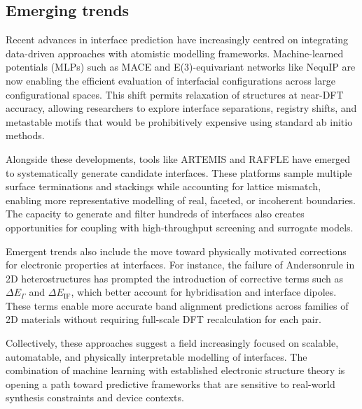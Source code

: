 \subsection{Emerging trends} 
 
Recent advances in interface prediction have increasingly centred on integrating data-driven approaches with atomistic modelling frameworks. Machine-learned potentials (MLPs) such as MACE and E(3)-equivariant networks like NequIP are now enabling the efficient evaluation of interfacial configurations across large configurational spaces. This shift permits relaxation of structures at near-DFT accuracy, allowing researchers to explore interface separations, registry shifts, and metastable motifs that would be prohibitively expensive using standard ab initio methods. 
 
Alongside these developments, tools like ARTEMIS and RAFFLE have emerged to systematically generate candidate interfaces. These platforms sample multiple surface terminations and stackings while accounting for lattice mismatch, enabling more representative modelling of real, faceted, or incoherent boundaries. The capacity to generate and filter hundreds of interfaces also creates opportunities for coupling with high-throughput screening and surrogate models. 
 
Emergent trends also include the move toward physically motivated corrections for electronic properties at interfaces. For instance, the failure of Anderson\rqss rule in 2D heterostructures has prompted the introduction of corrective terms such as $\Delta E_\Gamma$ and $\Delta E_\mathrm{IF}$, which better account for hybridisation and interface dipoles. These terms enable more accurate band alignment predictions across families of 2D materials without requiring full-scale DFT recalculation for each pair. 
 
Collectively, these approaches suggest a field increasingly focused on scalable, automatable, and physically interpretable modelling of interfaces. The combination of machine learning with established electronic structure theory is opening a path toward predictive frameworks that are sensitive to real-world synthesis constraints and device contexts. 